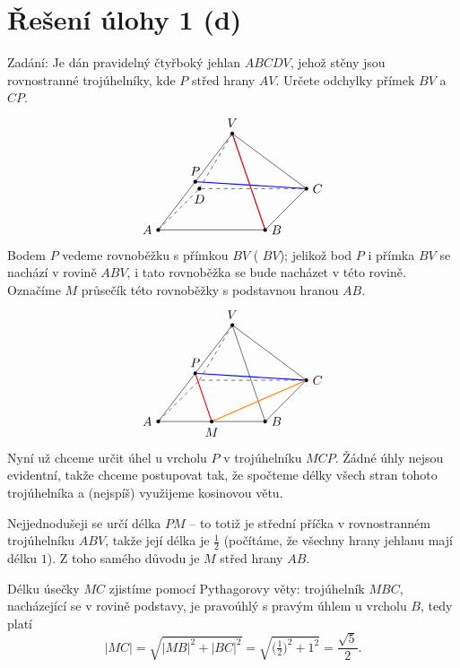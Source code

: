 \documentclass[10pt,a4paper]{article}
\begin{document}
\section*{Řešení úlohy 1 (d)}

\def\bod#1#2#3{\node[circle,fill=black,inner sep=0pt,outer sep=0pt,minimum size=3pt,label=#2:{$#3$}] (#3) at (#1) {};}

\def\zaklad{%
\draw[dashed] (0,0,1) -- (0,0,0) -- (1,0,0);%
\draw (1,0,0)-- (1,0,1) -- (0,0,1);
\draw (1,0,0) -- (.5,.707,.5) -- (1,0,1);
\draw (0,0,1) -- (.5,.707,.5);
\draw[dashed] (0,0,0) -- (.5,.707,.5);
\bod{.25,.3535,.75}{above}{P}
\bod{1,0,0}{right}{C}
\bod{1,0,1}{right}{B}
\bod{0,0,1}{left}{A}
\bod{.5,.707,.5}{above}{V}
}


Zadání: Je dán pravidelný čtyřboký jehlan $ABCDV$, jehož stěny jsou rovnostranné trojúhelníky, kde $P$ střed hrany $AV$. Určete odchylky přímek $BV$ a $CP$.
\[\begin{tikzpicture}[scale=3]
\zaklad
\bod{0,0,0}{below}{D}
\draw[blue,thick] (C) -- (P);
\draw[red,thick] (B) -- (V);
\end{tikzpicture}\]
Bodem $P$ vedeme rovnoběžku s přímkou $BV$ ( $BV$); jelikož bod $P$ i přímka $BV$ se nachází v rovině $ABV$, i tato rovnoběžka se bude nacházet v této rovině. Označíme $M$ průsečík této rovnoběžky s podstavnou hranou $AB$.
\[\begin{tikzpicture}[scale=3]
\zaklad
\bod{.5,0,1}{below}{M}
\draw[blue,thick] (C) -- (P);
\draw[red,thick] (M) -- (P);
\draw[orange,thick] (M) -- (C);
\end{tikzpicture}\]
Nyní už  chceme určit úhel u vrcholu $P$ v trojúhelníku $MCP$. Žádné úhly nejsou evidentní, takže chceme postupovat tak, že spočteme délky všech stran tohoto trojúhelníka a (nejspíš) využijeme kosinovou větu.

Nejjednodušeji se určí délka $PM$ -- to totiž je střední příčka v rovnostranném trojúhelníku $ABV$, takže její délka je $\frac12$ (počítáme, že všechny hrany jehlanu mají délku $1$). Z toho samého důvodu je $M$ střed hrany $AB$.

Délku úsečky $MC$ zjistíme pomocí Pythagorovy věty: trojúhelník $MBC$, nacházející se v rovině podstavy, je pravoúhlý s pravým úhlem u vrcholu $B$, tedy platí 
\[ |MC| = \sqrt{|MB|^2 + |BC|^2} = \sqrt{\bigl(\tfrac12\bigr)^2 + 1^2} = \frac{\sqrt5}{2}. \]
\end{document}
